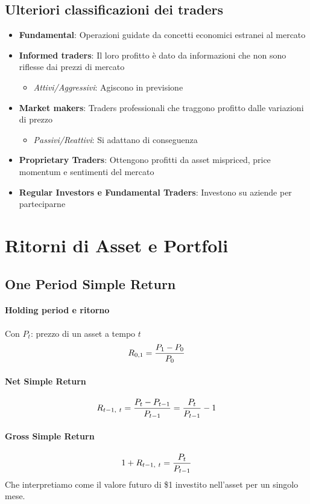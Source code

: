 \documentclass[12pt]{article}
\begin{document}
\subsection{Ulteriori classificazioni dei traders}
\begin{itemize}
    \item \textbf{Fundamental}: Operazioni guidate da concetti economici estranei al mercato
    \item \textbf{Informed traders}: Il loro profitto è dato da informazioni che non sono riflesse dai prezzi di mercato
          \begin{itemize}
              \item \textit{Attivi/Aggressivi}: Agiscono in previsione
          \end{itemize}
    \item \textbf{Market makers}: Traders professionali che traggono profitto dalle variazioni di prezzo
          \begin{itemize}
              \item \textit{Passivi/Reattivi}: Si adattano di conseguenza
          \end{itemize}
    \item \textbf{Proprietary Traders}: Ottengono profitti da asset mispriced, price momentum e sentimenti del mercato
    \item \textbf{Regular Investors e Fundamental Traders}: Investono su aziende per parteciparne
\end{itemize}
\newpage
\section{Ritorni di Asset e Portfoli}
\subsection{One Period Simple Return}
\paragraph{Holding period e ritorno}
Con $P_t$: prezzo di un asset a tempo $t$
$$R_{0, 1}={{P_1 - P_0}\over P_0}$$
\paragraph{Net Simple Return}
$$R_{t-1, \ t}={{P_t - P_{t-1}}\over P_{t-1}}={P_t \over P_{t-1}}-1$$
\paragraph{Gross Simple Return}
$$1 + R_{t-1, \ t}={P_t \over P_{t-1}}$$
Che interpretiamo come il valore futuro di \$1 investito nell’asset per un singolo mese.
\end{document}
